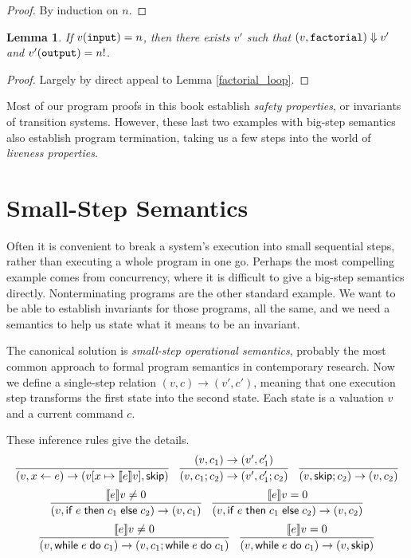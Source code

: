 \documentclass{amsbook}
\newtheorem{lemma}[theorem]{Lemma}
\theoremstyle{definition}
\theoremstyle{remark}
\numberwithin{section}{chapter}
\numberwithin{equation}{chapter}
\begin{document}
\begin{proof}
  By induction on $n$.
\end{proof}

\begin{lemma}
  If $v(\mathtt{input}) = n$, then there exists $v'$ such that $(v, \mathtt{factorial}) \Downarrow v'$ and $v'(\mathtt{output}) = n!$.
\end{lemma}

\begin{proof}
  Largely by direct appeal to Lemma \ref{factorial_loop}.
\end{proof}

Most of our program proofs in this book establish \emph{safety properties}, or invariants of transition systems.
However, these last two examples with big-step semantics also establish program termination, taking us a few steps into the world of \emph{liveness properties}.


\section{Small-Step Semantics}

Often it is convenient to break a system's execution into small sequential steps, rather than executing a whole program in one go.
Perhaps the most compelling example comes from concurrency, where it is difficult to give a big-step semantics directly.
Nonterminating programs are the other standard example.
We want to be able to establish invariants for those programs, all the same, and we need a semantics to help us state what it means to be an invariant.

\newcommand{\smallstep}[2]{#1 \to #2}

The canonical solution is \emph{small-step operational semantics}, probably the most common approach to formal program semantics in contemporary research.
Now we define a single-step relation $\smallstep{(v, c)}{(v', c')}$, meaning that one execution step transforms the first state into the second state.
Each state is a valuation $v$ and a current command $c$.

These inference rules give the details.
\encoding
$$\infer{\smallstep{(v, \assign{x}{e})}{(\mupd{v}{x}{\denote{e}v}, \skipe)}}{}
\quad \infer{\smallstep{(v, c_1; c_2)}{(v', c'_1; c_2)}}{
    \smallstep{(v, c_1)}{(v', c'_1)}
}
\quad \infer{\smallstep{(v, \skipe; c_2)}{(v, c_2)}}{}$$
$$\infer{\smallstep{(v, \ifte{e}{c_1}{c_2})}{(v, c_1)}}{
  \denote{e}v \neq 0
}
\quad \infer{\smallstep{(v, \ifte{e}{c_1}{c_2})}{(v, c_2)}}{
  \denote{e}v = 0
}$$
$$\infer{\smallstep{(v, \while{e}{c_1})}{(v, c_1; \while{e}{c_1})}}{
  \denote{e}v \neq 0
}
\quad \infer{\smallstep{(v, \while{e}{c_1})}{(v, \skipe)}}{
  \denote{e}v = 0
}$$
\end{document}
